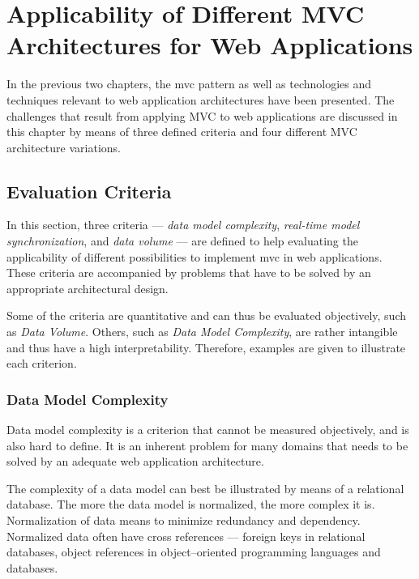 
\chapter{Applicability of Different MVC Architectures for Web Applications}
\label{chap:webmvc}
In the previous two chapters, the \acl{mvc} pattern as well as technologies and techniques relevant to web application architectures have been presented. The challenges that result from applying MVC to web applications are discussed in this chapter by means of three defined criteria and four different MVC architecture variations.

\section{Evaluation Criteria}
In this section, three criteria --- \emph{data model complexity}, \emph{real-time model synchronization}, and \emph{data volume} --- are defined to help evaluating the applicability of different possibilities to implement \ac{mvc} in web applications. These criteria are accompanied by problems that have to be solved by an appropriate architectural design.

Some of the criteria are quantitative and can thus be evaluated objectively, such as \emph{Data Volume}. Others, such as \emph{Data Model Complexity}, are rather intangible and thus have a high interpretability. Therefore, examples are given to illustrate each criterion.


\subsection{Data Model Complexity} %
\label{sec:complexity}
Data model complexity is a criterion that cannot be measured objectively, and is also hard to define. It is an inherent problem for many domains that needs to be solved by an adequate web application architecture.

The complexity of a data model can best be illustrated by means of a relational database. The more the data model is normalized, the more complex it is. Normalization of data means to minimize redundancy and dependency. Normalized data often have cross references --- foreign keys in relational databases, object references in object--oriented programming languages and databases.

